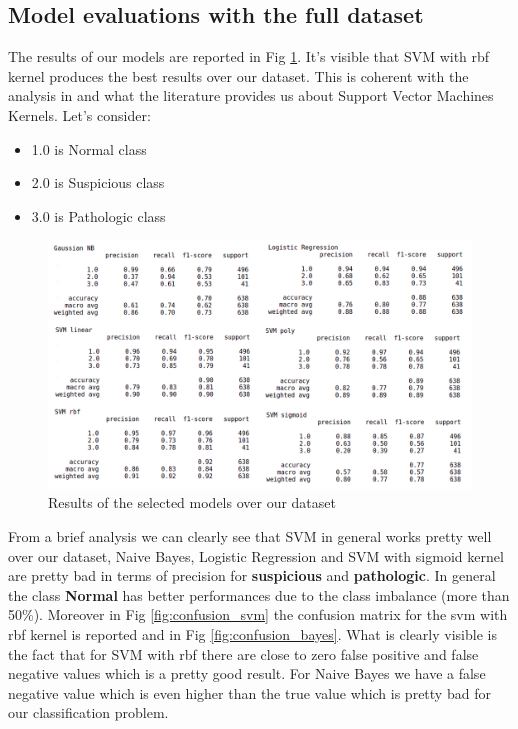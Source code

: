 \documentclass[a4paper,12pt]{article}
\begin{document}
\subsection{Model evaluations with the full dataset}

The results of our models are reported in Fig \ref{fig:fulldataset}. It's visible that SVM with rbf kernel produces the best results over our dataset. This is coherent with the analysis in \cite{ml} and what the literature provides us about Support Vector Machines Kernels. Let's consider:
\bigbreak
\begin{itemize}
  \item 1.0 is Normal class
  \item 2.0 is Suspicious class
  \item 3.0 is Pathologic class
\end{itemize} 

\begin{figure}[H]
  \begin{center}
  \includegraphics[width=1.0\textwidth]{images/fulldataset.png}
  \end{center}
  \caption{Results of the selected models over our dataset}
  \label{fig:fulldataset}
\end{figure}

\noindent From a brief analysis we can clearly see that SVM in general works pretty well over our dataset, Naive Bayes, Logistic Regression and SVM with sigmoid kernel are pretty bad in terms of precision for \textbf{suspicious} and \textbf{pathologic}. In general the class \textbf{Normal} has better performances due to the class imbalance (more than 50\%). Moreover in Fig \ref{fig:confusion_svm} the confusion matrix for the svm with rbf kernel is reported and in Fig \ref{fig:confusion_bayes}. What is clearly visible is the fact that for SVM with rbf there are close to zero false positive and false negative values which is a pretty good result. For Naive Bayes we have a false negative value which is even higher than the true value which is pretty bad for our classification problem.
\end{document}
